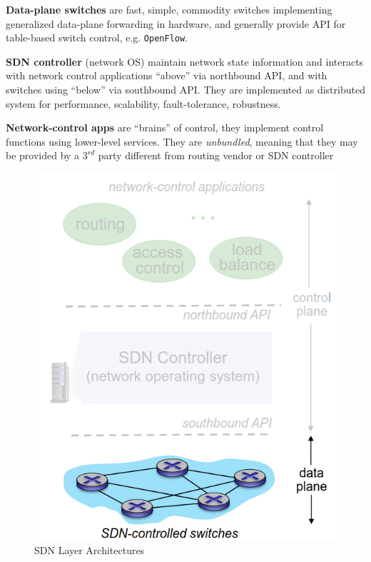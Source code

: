 \begin{paracol}{2}
   \textbf{Data-plane switches} are fast, simple, commodity switches implementing generalized data-plane forwarding in hardware, and generally provide API for table-based switch control, e.g. \texttt{OpenFlow}.

   \textbf{SDN controller} (network OS) maintain network state information and interacts with network control applications ``above'' via northbound API, and with switches using ``below'' via southbound API.
   They are implemented as distributed system for performance, scalability, fault-tolerance, robustness.

   \textbf{Network-control apps} are ``brains'' of control, they implement control functions using lower-level services. They are \textit{unbundled}, meaning that they may be provided by a $3^{rd}$ party different from routing vendor or SDN controller
   \switchcolumn
   \begin{figure}[htbp]
      \centering
      \includegraphics{images/sdn_planes3.png}
      \caption{SDN Layer Architectures}
      \label{fig:sdn_planes3}
   \end{figure}
\end{paracol}


